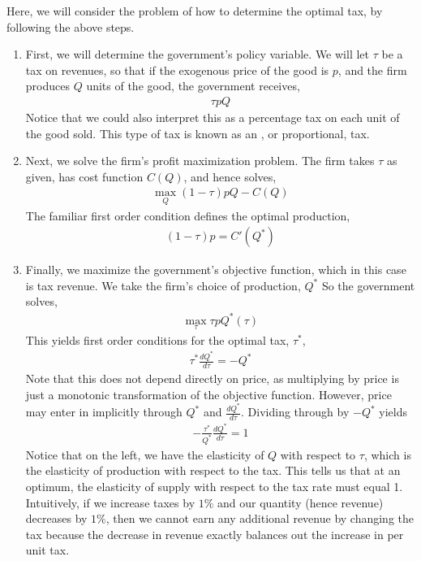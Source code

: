 Here, we will consider the problem of how to determine the optimal tax, by following the above steps.

\begin{enumerate}
    \item First, we will determine the government's policy variable. We will let $\tau$ be a tax on revenues, so that if the exogenous price of the good is $p$, and the firm produces $Q$ units of the good, the government receives,
    \begin{align*}
        \tau p Q
    \end{align*}
    Notice that we could also interpret this as a percentage tax on each unit of the good sold. This type of tax is known as an , or proportional, tax. 
    \item Next, we solve the firm's profit maximization problem. The firm takes $\tau$ as given, has cost function $C(Q)$, and hence solves,
    \begin{align*}
        \max_{Q} (1 - \tau) p Q - C(Q)
    \end{align*}
    The familiar first order condition defines the optimal production,
    \begin{align*}
        (1 - \tau) p = C'(Q^*)
    \end{align*}
    \item Finally, we maximize the government's objective function, which in this case is tax revenue. We take the firm's choice of production, $Q^*$ So the government solves,
    \begin{align*}
        \max_{\tau} \tau p Q^*(\tau)
    \end{align*}
    This yields first order conditions for the optimal tax, $\tau^*$, 
    \begin{align*}
        \tau^* \frac{dQ^*}{d\tau} = -Q^*
    \end{align*}
    Note that this does not depend directly on price, as multiplying by price is just a monotonic transformation of the objective function. However, price may enter in implicitly through $Q^*$ and $\frac{dQ^*}{d\tau}$. Dividing through by $-Q^*$ yields
    \begin{align*}
        -\frac{\tau^*}{Q^*} \frac{dQ^*}{d\tau} = 1
    \end{align*}
    Notice that on the left, we have the elasticity of $Q$ with respect to $\tau$, which is the elasticity of production with respect to the tax. This tells us that at an optimum, the elasticity of supply with respect to the tax rate must equal 1. Intuitively, if we increase taxes by $1\%$ and our quantity (hence revenue) decreases by $1\%$, then we cannot earn any additional revenue by changing the tax because the decrease in revenue exactly balances out the increase in per unit tax. 
\end{enumerate}

